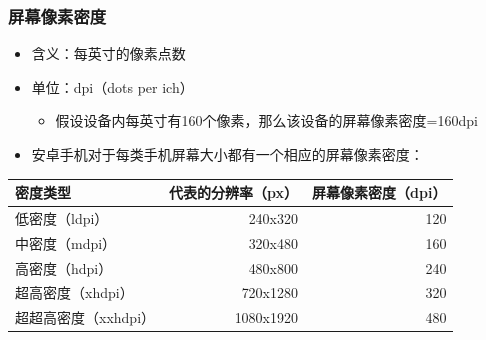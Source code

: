 \documentclass[9pt, b5paper]{article}
\begin{document}
\subsubsection{屏幕像素密度}
\label{sec-1-4-3}
\begin{itemize}
\item 含义：每英寸的像素点数
\item 单位：dpi（dots per ich）
\begin{itemize}
\item 假设设备内每英寸有160个像素，那么该设备的屏幕像素密度=160dpi
\end{itemize}
\item 安卓手机对于每类手机屏幕大小都有一个相应的屏幕像素密度：
\end{itemize}
\begin{center}
\begin{tabular}{lrr}
\hline
密度类型 & 代表的分辨率（px） & 屏幕像素密度（dpi）\\
\hline
低密度（ldpi） & 240x320 & 120\\
中密度（mdpi） & 320x480 & 160\\
高密度（hdpi） & 480x800 & 240\\
超高密度（xhdpi） & 720x1280 & 320\\
超超高密度（xxhdpi） & 1080x1920 & 480\\
\hline
\end{tabular}
\end{center}
\end{document}
